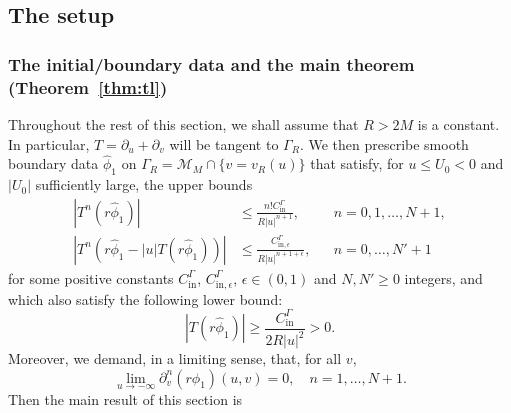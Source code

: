 \documentclass[11pt,english]{article}
\numberwithin{equation}{section}
\theoremstyle{remark}
\theoremstyle{plain}
\theoremstyle{remark}
\newcommand{\pu}{\partial_u}
\newcommand{\pv}{\partial_v}
\renewcommand{\(}{\left(}
\renewcommand{\)}{\right)}
\begin{document}
\subsection{The setup}\label{sec:tl:setup}
\subsubsection{The initial/boundary data and the main theorem (Theorem~\ref{thm:tl})}\label{sec:subsec:tl:setup}
Throughout the rest of this section, we shall assume that $R>2M$ is a constant. 
In particular, $T=\pu+\pv$ will be tangent to $\Gamma_R$. 
We then prescribe smooth boundary data $\hat{\phi}_1$ on $\Gamma_R=\mathcal{M}_M\cap\{v=v_R(u)\}$ that satisfy, for $u\leq U_0<0$ and $|U_0|$ sufficiently large, the upper bounds
\newcommand{\cin}{C_{\mathrm{in}}^\Gamma}
\newcommand{\ce}{C_{\mathrm{in},\epsilon}^\Gamma}
\begin{align}\label{eq:tl:boundarydata1}
\left|T^n(r\hat{\phi}_1)\right|&\leq \frac{n! \cin}{R|u|^{n+1}},&&n=0,1,\dots,N+1,\\
\left|T^n\left(r\hat{\phi}_1-|u|T(r\hat{\phi}_1)\right)\right|&\leq \frac{\ce}{R|u|^{n+1+\epsilon}},&& n=0,\dots,N'+1\label{eq:tl:boundarydata2}
\end{align}
for some positive constants $\cin$, $\ce$, $\epsilon\in(0,1)$ and $N,N'\geq 0$  integers, and which also satisfy the following lower bound:
\begin{equation}\label{eq:tl:thm:lowerbound}
\left|T(r\hat{\phi}_1)\right|\geq \frac{\cin}{2R|u|^{2}}>0.
\end{equation}
Moreover, we demand, in a limiting sense, that, for all $v$,
\begin{equation}\label{eq:tl:noincomingradiation}
\lim_{u\to-\infty}\pv^n(r\phi_1)(u,v)=0, \quad n=1,\dots, N+1.
\end{equation} 
Then the main result of this section is
\end{document}
